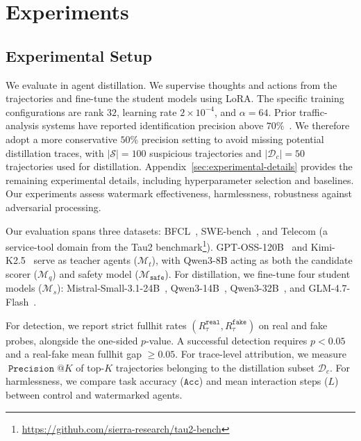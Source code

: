 \section{Experiments}
    
\label{sec:experiments}
\subsection{Experimental Setup}
    
We evaluate \name{} in agent distillation. We supervise thoughts and actions from the trajectories and fine-tune the student models using LoRA. The specific training configurations are rank $32$, learning rate $2\times10^{-4}$, and $\alpha = 64$. Prior traffic-analysis systems have reported identification precision above $70\%$~\cite{chiang2024chatbot, liu2026embarrassingly}. We therefore adopt a more conservative $50\%$ precision setting to avoid missing potential distillation traces, with $|\mathcal{S}|=100$ suspicious trajectories and $|\mathcal{D}_c|=50$ trajectories used for distillation. Appendix~\ref{sec:experimental-details} provides the remaining experimental details, including hyperparameter selection and baselines. Our experiments assess watermark effectiveness, harmlessness, robustness against adversarial processing.

 Our evaluation spans three datasets: BFCL~\cite{patil2025berkeley}, SWE-bench~\cite{jimenez2024swe}, and Telecom (a service-tool domain from the Tau2 benchmark\footnote{\url{https://github.com/sierra-research/tau2-bench}}). GPT-OSS-120B~\cite{agarwal2025gpt} and Kimi-K2.5~\cite{team2026kimi} serve as teacher agents ($\mathcal{M}_t$), with Qwen3-8B acting as both the candidate scorer ($\mathcal{M}_q$) and safety model ($\mathcal{M}_{\mathtt{safe}}$). For distillation, we fine-tune four student models ($\mathcal{M}_s$): Mistral-Small-3.1-24B~\cite{liu2026ministral}, Qwen3-14B~\cite{yang2025qwen3}, Qwen3-32B~\cite{yang2025qwen3}, and GLM-4.7-Flash~\cite{glm2024chatglm}.

 For detection, we report strict fullhit rates $(R_\tau^{\mathtt{real}},R_\tau^{\mathtt{fake}})$ on real and fake probes, alongside the one-sided $p$-value. A successful detection requires $p<0.05$ and a real-fake mean fullhit gap $\ge 0.05$. For trace-level attribution, we measure $\operatorname{\mathtt{Precision}}@K$ of top-$K$ trajectories belonging to the distillation subset $\mathcal{D}_c$. For harmlessness, we compare task accuracy ($\mathtt{Acc}$) and mean interaction steps ($L$) between control and watermarked agents.

